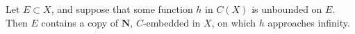 Let $E \subset X$, and suppose that some function $h$ in $C(X)$ is unbounded on $E$. Then $E$ contains a copy of $\mathbf{N}$, $C$-embedded in $X$, on which $h$ approaches infinity.
